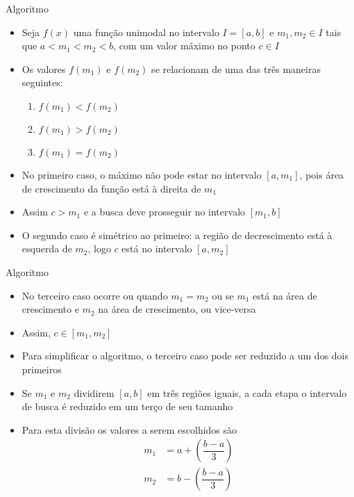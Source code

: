 \begin{frame}[fragile]{Algoritmo}

    \begin{itemize}
        \item Seja $f(x)$ uma função unimodal no intervalo $I = [a, b]$ e $m_1, m_2\in I$ tais
            que $a < m_1 < m_2 < b$, com um valor máximo no ponto $c\in I$

        \item Os valores $f(m_1)$ e $f(m_2)$ se relacionam de uma das três maneiras seguintes:
        \begin{enumerate}
            \item $f(m_1) < f(m_2)$
            \item $f(m_1) > f(m_2)$
            \item $f(m_1) = f(m_2)$
        \end{enumerate}

        \item No primeiro caso, o máximo não pode estar no intervalo $[a, m_1]$, pois 
            área de crescimento da função está à direita de $m_1$

        \item Assim $c > m_1$ e a busca deve prosseguir no intervalo $[m_1, b]$

        \item O segundo caso é simétrico ao primeiro: a região de decrescimento está à 
            esquerda de $m_2$, logo $c$ está no intervalo $[a, m_2]$
    \end{itemize}

\end{frame}

\begin{frame}[fragile]{Algoritmo}

    \begin{itemize}
        \item No terceiro caso ocorre ou quando $m_1 = m_2$ ou se $m_1$ está na área de crescimento
            e $m_2$ na área de crescimento, ou vice-versa

        \item Assim, $c\in [m_1, m_2]$

        \item Para simplificar o algoritmo, o terceiro caso pode ser reduzido a um dos dois
            primeiros

        \item Se $m_1$ e $m_2$ dividirem $[a, b]$ em três regiões iguais, a cada etapa
            o intervalo de busca é reduzido em um terço de seu tamanho

        \item Para esta divisão os valores a serem escolhidos são
        \begin{align*}
            m_1 &= a + \left(\dfrac{b - a}{3}\right) \\
            m_2 &= b - \left(\dfrac{b - a}{3}\right)
        \end{align*}
    \end{itemize}

\end{frame}

